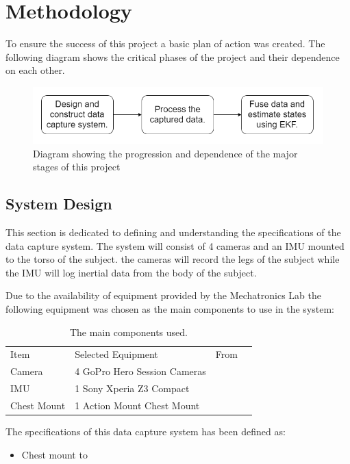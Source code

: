 \chapter{Methodology}
To ensure the success of this project a basic plan of action was created. The following diagram shows the critical phases of the project and their dependence on each other. 

\begin{figure}[!ht]
  \includegraphics[width=\linewidth]{figures/planOfAction.png}
  \caption{Diagram showing the progression and dependence of the major stages of this project}
  \label{fig:planofaction}
\end{figure}

  
\section{System Design}
This section is dedicated to defining and understanding the specifications of the data capture system. The system will consist of 4 cameras and an IMU mounted to the torso of the subject. the cameras will record the legs of the subject while the IMU will log inertial data from the body of the subject.

Due to the availability of equipment provided by the Mechatronics Lab the following equipment was chosen as the main components to use in the system:

\begin{table}[!ht]
\centering
\label{equipment-table}
\begin{tabular}{llll}
Item		& Selected Equipment		   & From		  \\
Camera      & 4 GoPro Hero Session Cameras & \cite{gopro} \\
IMU         & 1 Sony Xperia Z3 Compact     & \cite{sony}  \\
Chest Mount & 1 Action Mount Chest Mount   & \cite{actionmounts}   
\end{tabular}
\caption{The main components used.}
\end{table}

The specifications of this data capture system has been defined as:
\begin{itemize}
\item Chest mount to  
\end{itemize}





 



















